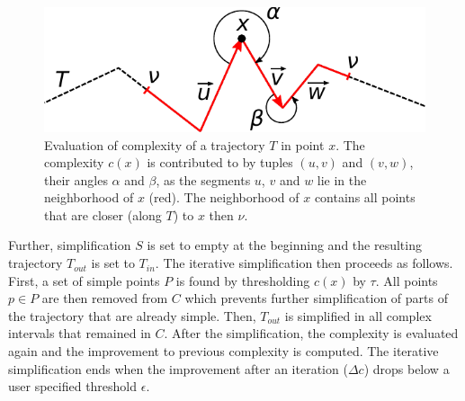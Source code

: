 \begin{figure}
	\includegraphics[width=0.95\linewidth]{img/complexity.pdf}
\caption{Evaluation of complexity of a trajectory $T$ in point $x$.
The complexity $c(x)$ is contributed to by tuples $(u, v)$ and $(v, w)$, \ie their angles $\alpha$ and $\beta$, as the segments $u$, $v$ and $w$ lie in the neighborhood of $x$ (red).
The neighborhood of $x$ contains all points that are closer (along $T$) to $x$ then $\nu$.}
\label{fig:complexity}
\end{figure}

Further, simplification $S$ is set to empty at the beginning and the resulting trajectory $T_{out}$ is set to $T_{in}$.
The iterative simplification then proceeds as follows.
First, a set of simple points $P$ is found by thresholding $c(x)$ by $\tau$.
All points $p \in P$ are then removed from $C$ which prevents further simplification of parts of the trajectory that are already simple.
Then, $T_{out}$ is simplified in all complex intervals that remained in $C$.
After the simplification, the complexity is evaluated again and the improvement to previous complexity is computed.
The iterative simplification ends when the improvement after an iteration ($\Delta c$) drops below a user specified threshold $\epsilon$.